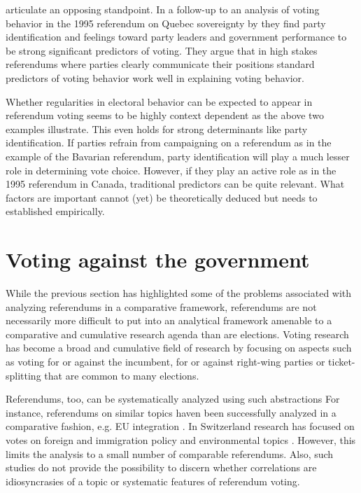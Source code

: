 \documentclass[11pt,a4paper]{article}\usepackage[]{graphicx}\usepackage[]{color}
\begin{document}
    \citet{clarke_referendum_2004} articulate an opposing standpoint. In a follow-up to an analysis of voting behavior in the 1995 referendum on Quebec sovereignty by \citet{nadeau_attitude_1999} they find party identification and feelings toward party leaders and government performance to be strong significant predictors of voting. They argue that in high stakes referendums where parties clearly communicate their positions standard predictors of voting behavior work well in explaining voting behavior.

    Whether regularities in electoral behavior can be expected to appear in referendum voting seems to be highly context dependent as the above two examples illustrate. This even holds for strong determinants like party identification. If parties refrain from campaigning on a referendum as in the example of the Bavarian referendum, party identification will play a much lesser role in determining vote choice. However, if they play an active role as in the 1995 referendum in Canada, traditional predictors can be quite relevant. What factors are important cannot (yet) be theoretically deduced but needs to established empirically.

    \section{Voting against the government}\label{sec:voteagainst} %
    
    While the previous section has highlighted some of the problems associated with analyzing referendums in a comparative framework, referendums are not necessarily more difficult to put into an analytical framework amenable to a comparative and cumulative research agenda than are elections. Voting research has become a broad and cumulative field of research by focusing on aspects such as voting for or against the incumbent, for or against right-wing parties or ticket-splitting that are common to many elections. 
    
    Referendums, too, can be systematically analyzed using such abstractions For instance, referendums on similar topics haven been successfully analyzed in a comparative fashion, e.g. EU integration \citep{hobolt_when_2005}. In Switzerland research has focused on votes on foreign and immigration policy \citep{sciarini_two-level_2009,sciarini_campaign_2011} and environmental topics \citep{bornstein_voting_2008}. However, this limits the analysis to a small number of comparable referendums. Also, such studies do not provide the possibility to discern whether correlations are idiosyncrasies of a topic or systematic features of referendum voting.
\end{document}
